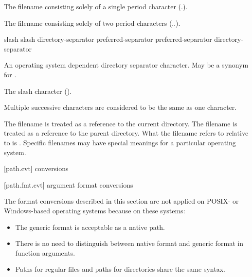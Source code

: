 \begin{ncbnf}
\br
    \textnormal{The filename consisting solely of a single period character (.).}
\end{ncbnf}

\begin{ncbnf}
\br
    \textnormal{The filename consisting solely of two period characters (..).}
\end{ncbnf}

\begin{ncbnf}
\br
    slash\br
    slash directory-separator\br
    preferred-separator\br
    preferred-separator directory-separator
\end{ncbnf}

\begin{ncbnf}
\br
    \textnormal{An operating system dependent directory separator character. May be a synonym for .}
\end{ncbnf}

\begin{ncbnf}
\br
    \textnormal{The slash character (\tcode{/}).}
\end{ncbnf}

\pnum
Multiple successive  characters are considered to
be the same as one  character.

\pnum
The filename  is treated as a reference to the current directory.
The filename  is treated as a reference to the parent directory.
What the filename  refers to
relative to  is .
Specific filenames may have special meanings for a particular operating system.

[path.cvt]{ conversions}

[path.fmt.cvt]{ argument format conversions}

\pnum
\begin{note}
The format conversions described in this section
are not applied on POSIX- or Windows-based operating systems
because on these systems:
\begin{itemize}
\item The generic format is acceptable as a native path.
\item There is no need to distinguish between native format and generic format in function arguments.
\item Paths for regular files and paths for directories share the same syntax.
\end{itemize}
\end{note}

